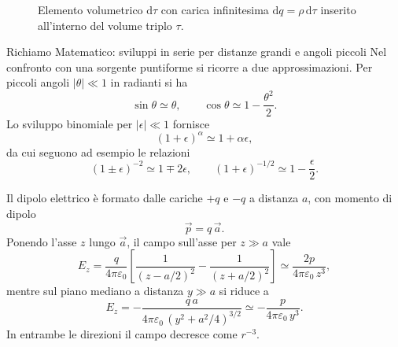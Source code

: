 \documentclass[11pt,a4paper]{article}
\newcommand{\epz}{\varepsilon_0}
\begin{document}
\begin{figure}[htbp]
  \caption{Elemento volumetrico $\mathrm{d}\tau$ con carica infinitesima $\mathrm{d}q = \rho\,\mathrm{d}\tau$ inserito all'interno del volume triplo $\tau$.}
  \label{fig:distribuzione_volumetrica_infografica}
\end{figure}


\begin{richiamo}{Richiamo Matematico: sviluppi in serie per distanze grandi e angoli piccoli}
Nel confronto con una sorgente puntiforme si ricorre a due approssimazioni. Per piccoli angoli $|\theta|\ll 1$ in radianti si ha
\[
\sin\theta\simeq\theta, \qquad \cos\theta\simeq 1-\frac{\theta^2}{2}.
\]
Lo sviluppo binomiale per $|\epsilon|\ll 1$ fornisce
\[
(1+\epsilon)^{\alpha}\simeq 1+\alpha\epsilon,
\]
da cui seguono ad esempio le relazioni
\[
(1\pm\epsilon)^{-2}\simeq 1\mp 2\epsilon, \qquad (1+\epsilon)^{-1/2}\simeq 1-\frac{\epsilon}{2}.
\]
\end{richiamo}

Il dipolo elettrico è formato dalle cariche $+q$ e $-q$ a distanza $a$, con momento di dipolo
\[
\vec p=q\,\vec a.
\]
Ponendo l'asse $z$ lungo $\vec a$, il campo sull'asse per $z\gg a$ vale
\[
E_z=\frac{q}{4\pi\epz}\left[\frac{1}{(z-a/2)^2}-\frac{1}{(z+a/2)^2}\right] \simeq \frac{2p}{4\pi\epz\,z^3},
\]
mentre sul piano mediano a distanza $y\gg a$ si riduce a
\[
E_z=-\frac{q\,a}{4\pi\epz\,(y^2+a^2/4)^{3/2}}\simeq-\frac{p}{4\pi\epz\,y^3}.
\]
In entrambe le direzioni il campo decresce come $r^{-3}$.
\end{document}
